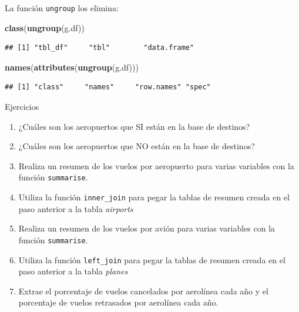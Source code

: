 \documentclass[]{article}
\newenvironment{Shaded}{\begin{snugshade}}{\end{snugshade}}
\newcommand{\KeywordTok}[1]{\textcolor[rgb]{0.13,0.29,0.53}{\textbf{#1}}}
\newcommand{\NormalTok}[1]{#1}
\begin{document}
La función \texttt{ungroup} los elimina:

\begin{Shaded}
\begin{Highlighting}[]
\KeywordTok{class}\NormalTok{(}\KeywordTok{ungroup}\NormalTok{(g.df))}
\end{Highlighting}
\end{Shaded}

\begin{verbatim}
## [1] "tbl_df"     "tbl"        "data.frame"
\end{verbatim}

\begin{Shaded}
\begin{Highlighting}[]
\KeywordTok{names}\NormalTok{(}\KeywordTok{attributes}\NormalTok{(}\KeywordTok{ungroup}\NormalTok{(g.df)))}
\end{Highlighting}
\end{Shaded}

\begin{verbatim}
## [1] "class"     "names"     "row.names" "spec"
\end{verbatim}

\renewcommand\bcStyleTitre[1]{\large\textcolor{bbblack}{#1}}

\begin{bclogo}[
  couleur=llred,
  arrondi=0,
  logo=\bcstop,
  barre=none,
  noborder=true]{Ejercicios}
\begin{enumerate}
\item ¿Cuáles son los aeropuertos que SI están en la base de destinos?
\item ¿Cuáles son los aeropuertos que NO están en la base de destinos?
\item Realiza un resumen de los vuelos por aeropuerto para varias variables con la función \texttt{summarise}.
\item Utiliza la función \texttt{inner\_join} para pegar la tablas de resumen creada en el paso anterior a la tabla \textit{airports}
\item Realiza un resumen de los vuelos por avión para varias variables con la función \texttt{summarise}.
\item Utiliza la función \texttt{left\_join} para pegar la tablas de resumen creada en el paso anterior a la tabla \textit{planes}
\item Extrae el porcentaje de vuelos cancelados por aerolínea cada año y el porcentaje de vuelos retrasados por aerolínea cada año.
\end{enumerate}

\end{bclogo}
\end{document}

